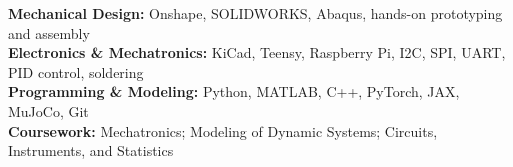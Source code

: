 \textbf{Mechanical Design:} Onshape, SOLIDWORKS, Abaqus, hands-on prototyping and assembly\\
\textbf{Electronics \& Mechatronics:} KiCad, Teensy, Raspberry Pi, I2C, SPI, UART, PID control, soldering\\
\textbf{Programming \& Modeling:} Python, MATLAB, C++, PyTorch, JAX, MuJoCo, Git\\
\textbf{Coursework:} Mechatronics; Modeling of Dynamic Systems; Circuits, Instruments, and Statistics
